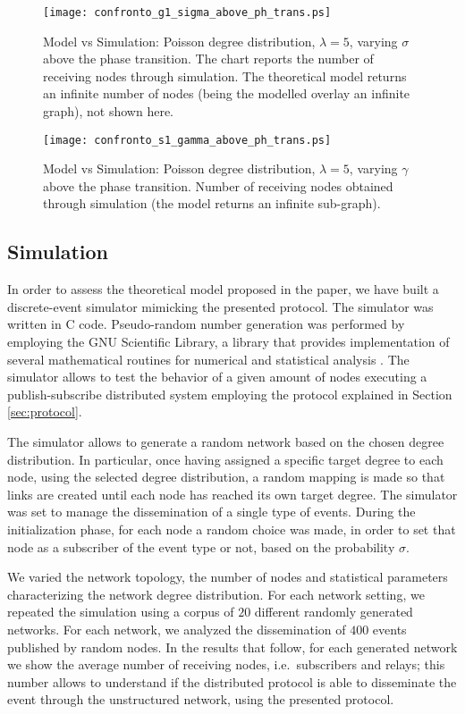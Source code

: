 \documentclass[10pt, conference, compsocconf]{IEEEtran}
\begin{document}
\begin{figure}[t]
   \centering
   \texttt{[image: confronto\_g1\_sigma\_above\_ph\_trans.ps]}
   \caption{Model vs Simulation: Poisson degree distribution, $\lambda = 5$, varying $\sigma$ above the phase transition. The chart reports the number of receiving nodes through simulation. The theoretical model returns an infinite number of nodes (being the mo\-del\-led overlay an infinite graph), not shown here.}
   \label{fig:confronto_s_above}
\end{figure}

\begin{figure}[t]
   \centering
   \texttt{[image: confronto\_s1\_gamma\_above\_ph\_trans.ps]}
   \caption{Model vs Simulation: Poisson degree distribution, $\lambda = 5$, varying $\gamma$ above the phase transition. Number of receiving nodes obtained through simulation (the model returns an infinite sub-graph).}
   \label{fig:confronto_g_above}
\end{figure}


\subsection{Simulation}

In order to assess the theoretical model proposed in the paper, we have built a discrete-event simulator mimicking the presented protocol. The simulator was written in C code. Pseudo-random number generation was performed by employing the GNU Scientific Library,  a library that provides implementation of several mathematical routines for numerical and statistical analysis \cite{gsl-web-2010}. The simulator allows to test the behavior of a given amount of nodes executing a publish-subscribe distributed system employing the protocol explained in Section \ref{sec:protocol}.

The simulator allows to generate a random network based on the chosen degree distribution. In particular, once having assigned a specific target degree to each node, using the selected degree distribution, a random mapping is made so that links are created until each node has reached its own target degree.
The simulator was set to manage the dissemination of a single type of events.
During the initialization phase, for each node a random choice was made, in order to set that node as a subscriber of the event type or not, based on the probability $\sigma$.

We varied the network topology, the number of nodes and statistical parameters characterizing the network degree distribution. For each network setting, we repeated the simulation using a corpus of $20$ different randomly generated networks. For each network, we analyzed the dissemination of $400$ events published by random nodes. In the results that follow, for each generated network we show the average number of receiving nodes, i.e.~subscribers and relays; this number allows to understand if the distributed protocol is able to disseminate the event through the unstructured network, using the presented protocol. 
\end{document}
